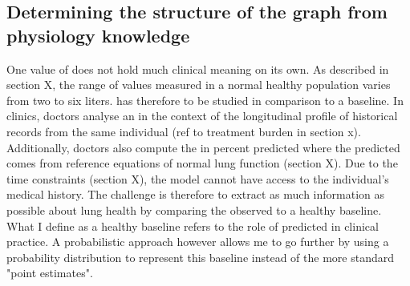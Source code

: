 
\subsection{Determining the structure of the graph from physiology knowledge}
One value of \F does not hold much clinical meaning on its own. As described in section X, the range of \F values measured in a normal healthy population varies from two to six liters. \F has therefore to be studied in comparison to a baseline. In clinics, doctors analyse an \F in the context of the longitudinal profile of historical \F records from the same individual (ref to treatment burden in section x). Additionally, doctors also compute the \F in percent predicted where the predicted \F comes from reference equations of normal lung function (section X). Due to the time constraints (section X), the model cannot have access to the individual's medical history. The challenge is therefore to extract as much information as possible about lung health by comparing the observed \F to a healthy baseline. What I define as a healthy baseline refers to the role of predicted \F in clinical practice. A probabilistic approach however allows me to go further by using a probability distribution to represent this baseline instead of the more standard "point estimates". 

